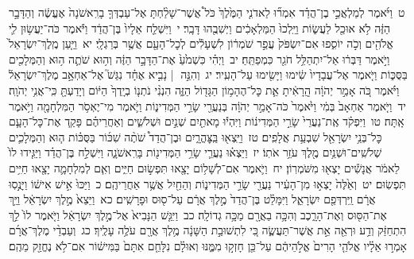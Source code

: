 \documentclass[18pt]{article}
\begin{document}
 {\loc ט~}וַיֹּ֜אמֶר לְמַלְאֲכֵ֣י בֶן־הֲדַ֗ד אִמְר֞וּ לַאדֹנִ֤י הַמֶּ֙לֶךְ֙ כֹּל֩ אֲשֶׁר־שָׁלַ֨חְתָּ אֶל־עַבְדְּךָ֤ בָרִֽאשֹׁנָה֙ אֶעֱשֶׂ֔ה וְהַדָּבָ֣ר הַזֶּ֔ה לֹ֥א אוּכַ֖ל לַעֲשׂ֑וֹת וַיֵּֽלְכוּ֙ הַמַּלְאָכִ֔ים וַיְשִׁבֻ֖הוּ דָּבָֽר׃ \startlock
 {\loc י~}וַיִּשְׁלַ֤ח אֵלָיו֙ בֶּן־הֲדַ֔ד וַיֹּ֕אמֶר כֹּה־יַעֲשׂ֥וּן לִ֛י אֱלֹהִ֖ים וְכֹ֣ה יוֹסִ֑פוּ אִם־יִשְׂפֹּק֙ עֲפַ֣ר שֹׁמְר֔וֹן לִשְׁעָלִ֕ים לְכׇל־הָעָ֖ם אֲשֶׁ֥ר בְּרַגְלָֽי׃ \startlock
 {\loc יא~}וַיַּ֤עַן מֶֽלֶךְ־יִשְׂרָאֵל֙ וַיֹּ֣אמֶר דַּבְּר֔וּ אַל־יִתְהַלֵּ֥ל חֹגֵ֖ר כִּמְפַתֵּֽחַ׃ \startlock
 {\loc יב~}וַיְהִ֗י כִּשְׁמֹ֙עַ֙ אֶת־הַדָּבָ֣ר הַזֶּ֔ה וְה֥וּא שֹׁתֶ֛ה ה֥וּא וְהַמְּלָכִ֖ים בַּסֻּכּ֑וֹת וַיֹּ֤אמֶר אֶל־עֲבָדָיו֙ שִׂ֔ימוּ וַיָּשִׂ֖ימוּ עַל־הָעִֽיר׃ \startlock
 {\loc יג~}וְהִנֵּ֣ה  |  נָבִ֣יא אֶחָ֗ד נִגַּשׁ֮ אֶל־אַחְאָ֣ב מֶלֶךְ־יִשְׂרָאֵל֒ וַיֹּ֗אמֶר כֹּ֚ה אָמַ֣ר יְהֹוָ֔ה הֲֽרָאִ֔יתָ אֵ֛ת כׇּל־הֶהָמ֥וֹן הַגָּד֖וֹל הַזֶּ֑ה הִנְנִ֨י נֹתְנ֤וֹ בְיָֽדְךָ֙ הַיּ֔וֹם וְיָדַעְתָּ֖ כִּֽי־אֲנִ֥י יְהֹוָֽה׃ \startlock
 {\loc יד~}וַיֹּ֤אמֶר אַחְאָב֙ בְּמִ֔י וַיֹּ֙אמֶר֙ כֹּה־אָמַ֣ר יְהֹוָ֔ה בְּנַעֲרֵ֖י שָׂרֵ֣י הַמְּדִינ֑וֹת וַיֹּ֛אמֶר מִי־יֶאְסֹ֥ר הַמִּלְחָמָ֖ה וַיֹּ֥אמֶר אָֽתָּה׃ \startlock
 {\loc טו~}וַיִּפְקֹ֗ד אֶֽת־נַעֲרֵי֙ שָׂרֵ֣י הַמְּדִינ֔וֹת וַיִּהְי֕וּ מָאתַ֖יִם שְׁנַ֣יִם וּשְׁלֹשִׁ֑ים וְאַחֲרֵיהֶ֗ם פָּקַ֧ד אֶת־כׇּל־הָעָ֛ם כׇּל־בְּנֵ֥י יִשְׂרָאֵ֖ל שִׁבְעַ֥ת אֲלָפִֽים׃ \startlock
 {\loc טז~}וַיֵּֽצְא֖וּ  בַּֽצׇּהֳרָ֑יִם  וּבֶן־הֲדַד֩ שֹׁתֶ֨ה שִׁכּ֜וֹר בַּסֻּכּ֗וֹת ה֧וּא וְהַמְּלָכִ֛ים שְׁלֹשִֽׁים־וּשְׁנַ֥יִם מֶ֖לֶךְ עֹזֵ֥ר אֹתֽוֹ׃ \startlock
 {\loc יז~}וַיֵּצְא֗וּ נַעֲרֵ֛י שָׂרֵ֥י הַמְּדִינ֖וֹת בָּרִֽאשֹׁנָ֑ה וַיִּשְׁלַ֣ח בֶּן־הֲדַ֗ד וַיַּגִּ֤ידוּ לוֹ֙ לֵאמֹ֔ר אֲנָשִׁ֕ים יָצְא֖וּ מִשֹּׁמְרֽוֹן׃ \startlock
 {\loc יח~}וַיֹּ֛אמֶר אִם־לְשָׁל֥וֹם יָצָ֖אוּ תִּפְשׂ֣וּם חַיִּ֑ים וְאִ֧ם לְמִלְחָמָ֛ה יָצָ֖אוּ חַיִּ֥ים תִּפְשֽׂוּם׃ \startlock
 {\loc יט~}וְאֵ֙לֶּה֙ יָצְא֣וּ מִן־הָעִ֔יר נַעֲרֵ֖י שָׂרֵ֣י הַמְּדִינ֑וֹת וְהַחַ֖יִל אֲשֶׁ֥ר אַחֲרֵיהֶֽם׃ \startlock
 {\loc כ~}וַיַּכּוּ֙ אִ֣ישׁ אִישׁ֔וֹ וַיָּנֻ֣סֽוּ אֲרָ֔ם וַֽיִּרְדְּפֵ֖ם יִשְׂרָאֵ֑ל וַיִּמָּלֵ֗ט בֶּן־הֲדַד֙ מֶ֣לֶךְ אֲרָ֔ם עַל־ס֖וּס וּפָרָשִֽׁים׃ \startlock
 {\loc כא~}וַיֵּצֵא֙ מֶ֣לֶךְ יִשְׂרָאֵ֔ל וַיַּ֥ךְ אֶת־הַסּ֖וּס וְאֶת־הָרָ֑כֶב וְהִכָּ֥ה בַאֲרָ֖ם מַכָּ֥ה גְדוֹלָֽה׃ \startlock
 {\loc כב~}וַיִּגַּ֤שׁ הַנָּבִיא֙ אֶל־מֶ֣לֶךְ יִשְׂרָאֵ֔ל וַיֹּ֤אמֶר לוֹ֙ לֵ֣ךְ הִתְחַזַּ֔ק וְדַ֥ע וּרְאֵ֖ה אֵ֣ת אֲשֶׁר־תַּעֲשֶׂ֑ה כִּ֚י לִתְשׁוּבַ֣ת הַשָּׁנָ֔ה מֶ֥לֶךְ אֲרָ֖ם עֹלֶ֥ה עָלֶֽיךָ׃ \startlock
 {\loc כג~}וְעַבְדֵ֨י מֶלֶךְ־אֲרָ֜ם אָמְר֣וּ אֵלָ֗יו אֱלֹהֵ֤י הָרִים֙ אֱלֹ֣הֵיהֶ֔ם עַל־כֵּ֖ן חָזְק֣וּ מִמֶּ֑נּוּ וְאוּלָ֗ם נִלָּחֵ֤ם אִתָּם֙ בַּמִּישׁ֔וֹר אִם־לֹ֥א נֶחֱזַ֖ק מֵהֶֽם׃ \startlock
\end{document}
